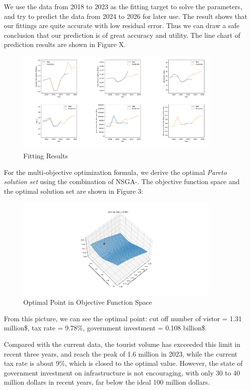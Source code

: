 \documentclass{mcmthesis}
\begin{document}
We use the data from 2018 to 2023 as the fitting target to solve the parameters, and try to predict the data from 2024 to 2026 for later use. 
The result shows that our fittings are quite accurate with low residual error. Thus we can draw a safe conclusion that our prediction
is of great accuracy and utility. The line chart of prediction results are shown in Figure X.
\begin{figure}[H]
  \centering
  \includegraphics[width=0.9\textwidth]{figures/pc.png}
  \caption{Fitting Results}
  \label{Figure.XX}
\end{figure}

For the multi-objective optimization formula, we derive the optimal \emph{Pareto solution set} using the combination of NSGA-\uppercase\expandafter{}.
The objective function space and the optimal solution set are shown in Figure 3:
\begin{figure}[H]
  \centering
  \includegraphics[width=0.9\textwidth]{figures/model1opt.png}
  \caption{Optimal Point in Objective Function Space}
  \label{Figure.XXX}
\end{figure}

From this picture, we can see the optimal point: cut off number of vistor = 1.31 million\$, tax rate = 9.78\%, government investment = 0.108 billion\$.

Compared with the current data, the tourist volume has excceeded this limit in recent three years, and reach the peak of 1.6 million in 2023, 
while the current tax rate is about 9\%, which is closed to the optimal value. However, the state of government investment on infrastructure is not encouraging,
with only 30 to 40 million dollars in recent years, far below the ideal 100 million dollars.
\end{document}
